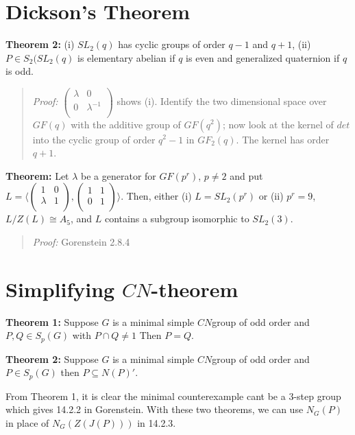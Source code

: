 \section{Dickson's Theorem}
{\bf Theorem 2:} (i) $SL_2(q)$ has cyclic groups of order $q-1$ and $q+1$, (ii) $P \in S_2(SL_2(q)$ is
elementary abelian if $q$ is even and generalized quaternion if $q$ is odd.
\begin{quote}
\emph{Proof:}
$ \left(
\begin{array}{cc}
\lambda  &  0 \\
0 &  {\lambda}^{-1} \\
\end{array}
\right)$ shows (i). Identify the two dimensional space over $GF(q)$ with the additive group of $GF(q^2)$;
now look at the kernel of $det$ into the cyclic group of order $q^2-1$ in $GF_2(q)$.  The kernel has order $q+1$.
\end{quote}
{\bf Theorem:} Let $\lambda$ be a generator for $GF(p^r )$, $p \ne 2$ and put
$L= \langle
\left(
\begin{array}{cc}
1 &  0 \\
\lambda &  1 \\
\end{array}
\right),
\left(
\begin{array}{cc}
1 &  1\\
0 &  1\\
\end{array}
\right)
\rangle$. Then, either (i) $L=SL_2(p^r)$ or (ii) $p^r=9$, $L/Z(L) \cong A_5$, and
$L$ contains a subgroup isomorphic to $SL_2(3)$.
\begin{quote}
\emph{Proof:}
Gorenstein 2.8.4
\end{quote}
\section{Simplifying $CN$-theorem}
{\bf Theorem 1:} Suppose $G$ is a minimal simple $CN$group of odd order and $P, Q \in S_p(G)$ with
$P \cap Q \ne 1$  Then $P=Q$.
\begin{quote}
\end{quote}
{\bf Theorem 2:} Suppose $G$ is a minimal simple $CN$group of odd order and $P \in S_p(G)$ then
$P \subseteq N(P)'$.
\begin{quote}
\end{quote}
From Theorem 1, it is clear the minimal counterexample cant be a $3$-step group which gives 14.2.2 
in Gorenstein.  With these two theorems, we can use $N_G(P)$ in place of $N_G(Z(J(P)))$ in 14.2.3.
